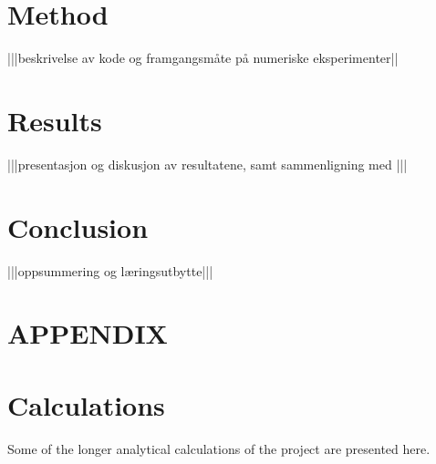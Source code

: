 \documentclass[a4paper,8pt]{article}
\begin{document}
\begin{multicols}{2}
\section{Method}\label{method}
|||beskrivelse av kode og framgangsmåte på numeriske eksperimenter||


\section{Results}\label{results}
|||presentasjon og diskusjon av resultatene, samt sammenligning med \cite{SWL}|||


\section{Conclusion}
|||oppsummering og læringsutbytte|||


\end{multicols}




\newpage
\appendix
\setcounter{equation}{0}
\renewcommand{\theequation}{\thesection\arabic{equation}}
\section*{APPENDIX}
\section{Calculations}
Some of the longer analytical calculations of the project are presented here.
\end{document}
